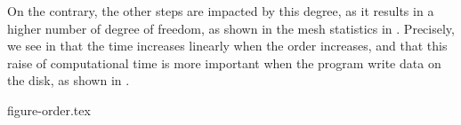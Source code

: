 On the contrary, the other steps are impacted by this degree, as it results in a higher number of degree of freedom, as shown in the mesh statistics in .
Precisely, we see in  that the time increases linearly when the order increases, and that this raise of computational time is more important when the program write data on the disk, as shown in .

{figure-order.tex}

